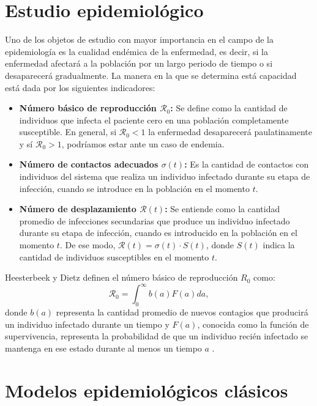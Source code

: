 \section{Estudio epidemiológico}\label{sec:Estudio epidemiológico}
Uno de los objetos de estudio con mayor importancia en el campo de la epidemiología es la cualidad endémica de la enfermedad, es decir, si la enfermedad afectará a la población por un largo periodo de tiempo o si desaparecerá gradualmente. La manera en la que se determina está capacidad está dada por los siguientes indicadores:

\begin{itemize}
    \item \textbf{Número básico de reproducción $\mathcal{R}_0$:} Se define como la cantidad de individuos que infecta el paciente cero en una población completamente susceptible. En general, si $\mathcal{R}_0<1$ la enfermedad desaparecerá paulatinamente y sí $\mathcal{R}_0>1$, podríamos estar ante un caso de endemia.
    \item \textbf{Número de contactos adecuados $\sigma(t)$:} Es la cantidad de contactos con individuos del sistema que realiza un individuo infectado durante su etapa de infección, cuando se introduce en la población en el momento $t$.
    \item \textbf{Número de desplazamiento $\mathcal{R}(t)$:} Se entiende como la cantidad promedio de infecciones secundarias que produce un individuo infectado durante su etapa de infección, cuando es introducido en la población en el momento $t$. De ese modo, $\mathcal{R}(t) = \sigma(t)\cdot S(t)$, donde $S(t)$ indica la cantidad de individuos susceptibles en el momento $t$.
\end{itemize}

Heesterbeek y Dietz definen el número básico de reproducción $R_0$ como:
\begin{equation}\label{eq:R0}
    \mathcal{R}_0 = \int_0^\infty b(a)F(a) da,
\end{equation}
donde $b(a)$ representa la cantidad promedio de nuevos contagios que producirá un individuo infectado durante un tiempo y $F(a)$, conocida como la función de supervivencia, representa la probabilidad de que un individuo recién infectado se mantenga en ese estado durante al menos un tiempo $a$ \cite{conceptOfR0, perspectivesOnR0}.

\section{Modelos epidemiológicos clásicos}\label{sec:Modelos epidemiológicos clásicos}

